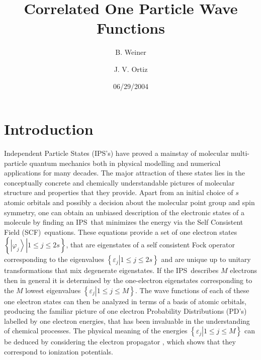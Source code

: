 \documentclass[aps,preprint]{revtex4}%
\begin{document}
\preprint{ }
\title{Correlated One Particle Wave Functions}
\author{B. Weiner}
\author{J. V. Ortiz}
\pacs{}

\begin{abstract}


\end{abstract}
\date{06/29/2004}
\maketitle
\tableofcontents


\section{ Introduction \label{intro}}

Independent Particle States (IPS's) have proved a mainstay of molecular
multi-particle quantum mechanics both in physical modelling and numerical
applications for many decades. The major attraction of these states lies in
the conceptually concrete and chemically understandable pictures of molecular
structure and properties that they provide. Apart from an initial choice of
$s$ atomic orbitals and possibly a decision about the molecular point group
and spin symmetry, one can obtain an unbiased description of the electronic
states of a molecule by finding an IPS\ that minimizes the energy via the Self
Consistent Field (SCF)\ equations. These equations provide a set of one
electron states $\left\{  \left.  \left\vert \varphi_{j}\right\rangle
\right\vert 1\leq j\leq2s\right\}  $, that are eigenstates of a self
consistent Fock operator corresponding to the eigenvalues $\left\{  \left.
\varepsilon_{j}\right\vert 1\leq j\leq2s\right\}  $ and are unique up to
unitary transformations that mix degenerate eigenstates. If the IPS\ describes
$M$ electrons then in general it is determined by the one-electron eigenstates
corresponding to the $M$ lowest eigenvalues $\left\{  \left.  \varepsilon
_{j}\right\vert 1\leq j\leq M\right\}  $. The wave functions of each of these
one electron states can then be analyzed in terms of a basis of atomic
orbitals, producing the familiar picture of one electron Probability
Distributions (PD's) labelled by one electron energies, that has been
invaluable in the understanding of chemical processes. The physical meaning of
the energies $\left\{  \left.  \varepsilon_{j}\right\vert 1\leq j\leq
M\right\}  $ can be deduced by considering the electron propagator
\cite{ortiz}, which shows that they correspond to ionization potentials.
\end{document}
